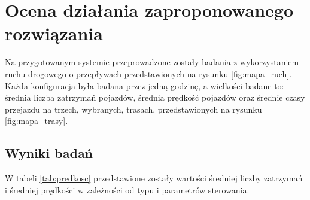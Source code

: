 \chapter{Ocena działania zaproponowanego rozwiązania}
\label{chap:ocena}
Na przygotowanym systemie przeprowadzone zostały badania z wykorzystaniem ruchu drogowego o przepływach przedstawionych na rysunku \ref{fig:mapa_ruch}. Każda konfiguracja była badana przez jedną godzinę, a wielkości badane to: średnia liczba zatrzymań pojazdów, średnia prędkość pojazdów oraz średnie czasy przejazdu na trzech, wybranych, trasach, przedstawionych na rysunku \ref{fig:mapa_trasy}.

\section{Wyniki badań}
W tabeli \ref{tab:predkosc} przedstawione zostały wartości średniej liczby zatrzymań i średniej prędkości w zależności od typu i parametrów sterowania.

